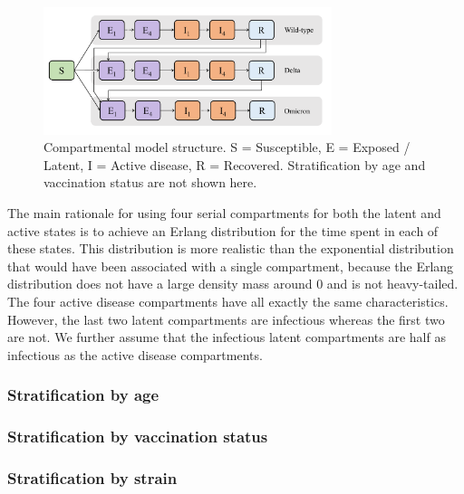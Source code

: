 \begin{figure}[ht]
    \begin{center}
    \includegraphics[width=0.75\textwidth]{../../tex_descriptions/models/sm_covid/sm_covid_se4i4r.pdf}
    \end{center}
    \caption{Compartmental model structure. 
    S = Susceptible, E = Exposed / Latent, I = Active disease, R = Recovered.
    Stratification by age and vaccination status are not shown here.
    } 
    \label{fig:se4i4r}
\end{figure}

The main rationale for using four serial compartments for both the latent and active states is to achieve an Erlang distribution for the time spent in each of these states. This distribution is more realistic than
the exponential distribution that would have been associated with a single compartment, because the Erlang distribution does not have a large density mass around 0 and is not heavy-tailed. 
The four active disease compartments have all exactly the same characteristics. However, the last two latent compartments are infectious whereas the first two are not. We further assume that 
the infectious latent compartments are half as infectious as the active disease compartments.

\subsubsection{Stratification by age}


\subsubsection{Stratification by vaccination status}


\subsubsection{Stratification by strain}